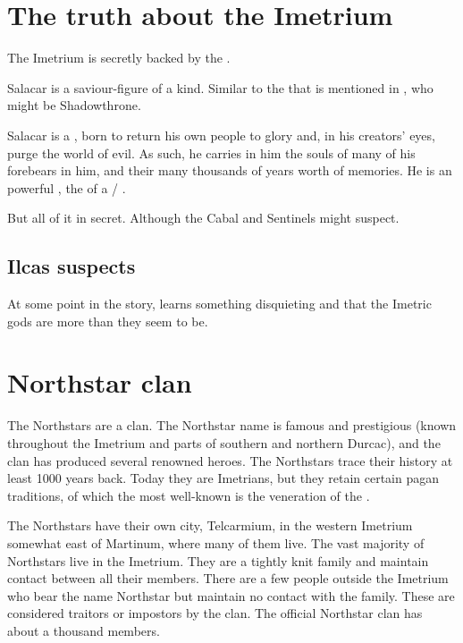 \section{The truth about the Imetrium}
The Imetrium is secretly backed by the \nagae. 

Salacar is a saviour-figure of a kind. 
Similar to the \human{}  that is mentioned in \cite{StevenErikson:TheBonehunters}, who might be Shadowthrone. 

Salacar is a , born to return his own people to glory and, in his creators' eyes, purge the world of evil. 
As such, he carries in him the souls of many of his forebears in him, and their many thousands of years worth of memories. 
He is an powerful \vertex, the \apex{} of a \cuezcan/\naga{} \matrixx. 

But all of it in secret. 
Although the Cabal and Sentinels might suspect.





\subsection{Ilcas suspects}
At some point in the story,  learns something disquieting and  that the Imetric gods are more than they seem to be. 









\section{Northstar clan}
The Northstars are a \scathaese{} clan. 
The Northstar name is famous and prestigious (known throughout the Imetrium and parts of southern \Velcad{} and northern Durcac), and the clan has produced several renowned heroes. 
The Northstars trace their history at least 1000 years back. 
Today they are Imetrians, but they retain certain pagan traditions, of which the most well-known is the veneration of the . 

The Northstars have their own city, Telcarmium, in the western Imetrium somewhat east of Martinum, where many of them live. The vast majority of Northstars live in the Imetrium. 
They are a tightly knit family and maintain contact between all their members. 
There are a few people outside the Imetrium who bear the name Northstar but maintain no contact with the family. 
These are considered traitors or impostors by the clan. 
The official Northstar clan has about a thousand members. 

